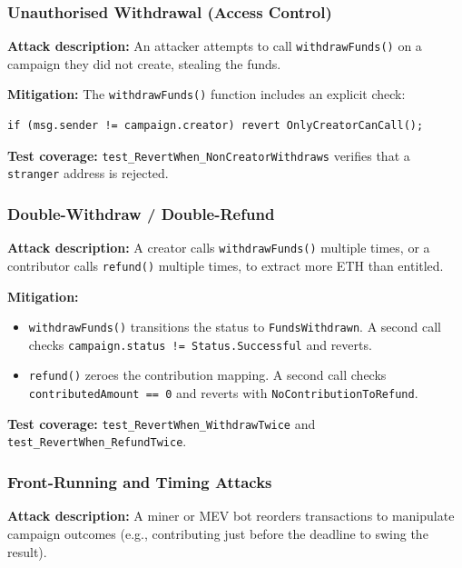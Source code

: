 \subsubsection{Unauthorised Withdrawal (Access Control)}

\textbf{Attack description:} An attacker attempts to call \texttt{withdrawFunds()} on a campaign they did not create, stealing the funds.

\textbf{Mitigation:} The \texttt{withdrawFunds()} function includes an explicit check:
\begin{lstlisting}[language=Solidity]
if (msg.sender != campaign.creator) revert OnlyCreatorCanCall();
\end{lstlisting}

\textbf{Test coverage:} \texttt{test\_RevertWhen\_NonCreatorWithdraws} verifies that a \texttt{stranger} address is rejected.

\subsubsection{Double-Withdraw / Double-Refund}

\textbf{Attack description:} A creator calls \texttt{withdrawFunds()} multiple times, or a contributor calls \texttt{refund()} multiple times, to extract more ETH than entitled.

\textbf{Mitigation:}
\begin{itemize}[leftmargin=1.5em]
    \item \texttt{withdrawFunds()} transitions the status to \texttt{FundsWithdrawn}. A second call checks \texttt{campaign.status != Status.Successful} and reverts.
    \item \texttt{refund()} zeroes the contribution mapping. A second call checks \texttt{contributedAmount == 0} and reverts with \texttt{NoContributionToRefund}.
\end{itemize}

\textbf{Test coverage:} \texttt{test\_RevertWhen\_WithdrawTwice} and \texttt{test\_RevertWhen\_RefundTwice}.

\subsubsection{Front-Running and Timing Attacks}

\textbf{Attack description:} A miner or MEV bot reorders transactions to manipulate campaign outcomes (e.g., contributing just before the deadline to swing the result).

